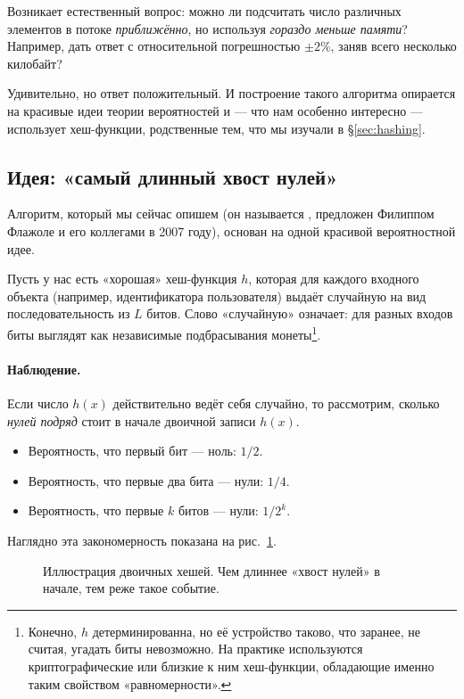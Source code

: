 Возникает естественный вопрос: можно ли подсчитать число различных элементов в потоке \emph{приближённо}, но используя \emph{гораздо меньше памяти}? Например, дать ответ с относительной погрешностью $\pm 2\%$, заняв всего несколько килобайт?

Удивительно, но ответ положительный. И построение такого алгоритма опирается на красивые идеи теории вероятностей и --- что нам особенно интересно --- использует хеш-функции, родственные тем, что мы изучали в §\ref{sec:hashing}.

\subsection{Идея: «самый длинный хвост нулей»}

Алгоритм, который мы сейчас опишем (он называется , предложен Филиппом Флажоле и его коллегами в 2007 году), основан на одной красивой вероятностной идее.

Пусть у нас есть «хорошая» хеш-функция $h$, которая для каждого входного объекта (например, идентификатора пользователя) выдаёт случайную на вид последовательность из $L$ битов. Слово «случайную» означает: для разных входов биты выглядят как независимые подбрасывания монеты\footnote{Конечно, $h$ детерминированна, но её устройство таково, что заранее, не считая, угадать биты невозможно. На практике используются криптографические или близкие к ним хеш-функции, обладающие именно таким свойством «равномерности».}.

\paragraph*{Наблюдение.} Если число $h(x)$ действительно ведёт себя случайно, то рассмотрим, сколько \emph{нулей подряд} стоит в начале двоичной записи $h(x)$.
\begin{itemize}
  \item Вероятность, что первый бит --- ноль: $1/2$.
  \item Вероятность, что первые два бита --- нули: $1/4$.
  \item Вероятность, что первые $k$ битов --- нули: $1/2^k$.
\end{itemize}

Наглядно эта закономерность показана на рис.~\ref{fig:p6-1}.

\begin{figure}[H]
\centering
{}
\caption{Иллюстрация двоичных хешей. Чем длиннее «хвост нулей» в начале, тем реже такое событие.}
\label{fig:p6-1}
\end{figure}

